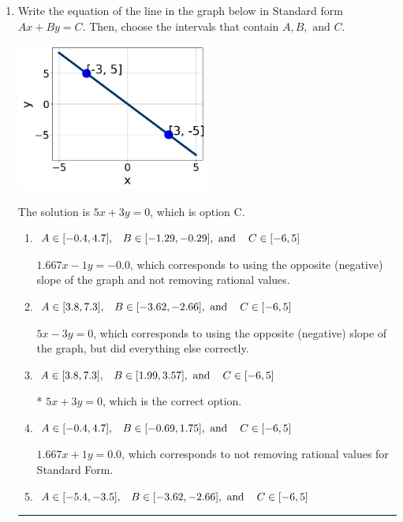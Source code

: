 \documentclass{extbook}[14pt]
\newcommand{\litem}[1]{\item #1

\rule{\textwidth}{0.4pt}}
\begin{document}
\begin{enumerate}\litem{
Write the equation of the line in the graph below in Standard form $Ax+By=C$. Then, choose the intervals that contain $A, B, \text{ and } C$.

\begin{center}
    \includegraphics[width=0.5\textwidth]{../Figures/linearGraphToStandardCopyA.png}
\end{center}


The solution is \( 5x + 3y = 0 \), which is option C.\begin{enumerate}[label=\Alph*.]
\item \( A \in [-0.4, 4.7], \hspace{3mm} B \in [-1.29, -0.29], \text{ and } \hspace{3mm} C \in [-6, 5] \)

 $1.667x - 1y = -0.0$, which corresponds to using the opposite (negative) slope of the graph and not removing rational values.
\item \( A \in [3.8, 7.3], \hspace{3mm} B \in [-3.62, -2.66], \text{ and } \hspace{3mm} C \in [-6, 5] \)

 $5x - 3y = 0$, which corresponds to using the opposite (negative) slope of the graph, but did everything else correctly.
\item \( A \in [3.8, 7.3], \hspace{3mm} B \in [1.99, 3.57], \text{ and } \hspace{3mm} C \in [-6, 5] \)

* $5x + 3y = 0$, which is the correct option.
\item \( A \in [-0.4, 4.7], \hspace{3mm} B \in [-0.69, 1.75], \text{ and } \hspace{3mm} C \in [-6, 5] \)

 $1.667x + 1y = 0.0$, which corresponds to not removing rational values for Standard Form.
\item \( A \in [-5.4, -3.5], \hspace{3mm} B \in [-3.62, -2.66], \text{ and } \hspace{3mm} C \in [-6, 5] \)


\end{enumerate}}
\end{enumerate}
\end{document}
